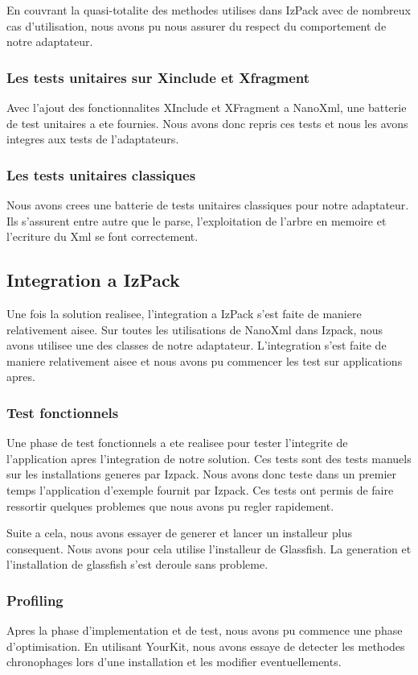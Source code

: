 En couvrant la quasi-totalite des methodes utilises dans IzPack avec de nombreux cas d'utilisation, nous avons pu nous assurer du respect du comportement de notre adaptateur.
\subsubsection{Les tests unitaires sur Xinclude et Xfragment}
Avec l'ajout des fonctionnalites XInclude et XFragment a NanoXml, une batterie de test unitaires a ete fournies. Nous avons donc repris ces tests et nous les avons integres aux tests de l'adaptateurs. 
\subsubsection{Les tests unitaires classiques}
Nous avons crees une batterie de tests unitaires classiques pour notre adaptateur. Ils s'assurent entre autre que le parse, l'exploitation de l'arbre en memoire et l'ecriture du Xml se font correctement.
\subsection{Integration a IzPack}
Une fois la solution realisee, l'integration a IzPack s'est faite de maniere relativement aisee. Sur toutes les utilisations de NanoXml dans Izpack, nous avons utilisee une des classes de notre adaptateur. L'integration s'est faite de maniere relativement aisee et nous avons pu commencer les test sur applications apres.
\subsubsection{Test fonctionnels}
Une phase de test fonctionnels a ete realisee pour tester l'integrite de l'application apres l'integration de notre solution. Ces tests sont des tests manuels sur les installations generes par Izpack. Nous avons donc teste dans un premier temps l'application d'exemple fournit par Izpack. Ces tests ont permis de faire ressortir quelques problemes que nous avons pu regler rapidement.

Suite a cela, nous avons essayer de generer et lancer un installeur plus consequent. Nous avons pour cela utilise l'installeur de Glassfish. La generation et l'installation de glassfish s'est deroule sans probleme.
\subsubsection{Profiling}
Apres la phase d'implementation et de test, nous avons pu commence une phase d'optimisation. En utilisant YourKit, nous avons essaye de detecter les methodes chronophages lors d'une installation et les modifier eventuellements.
